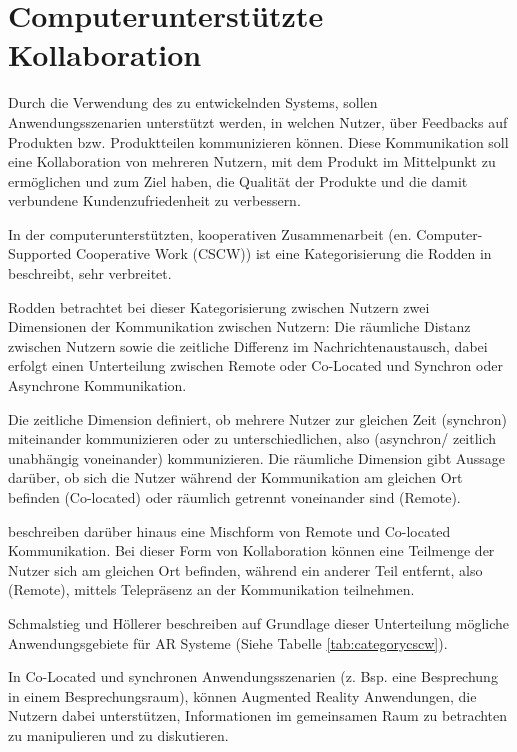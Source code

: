 \section{Computerunterstützte Kollaboration}

Durch die Verwendung des zu entwickelnden Systems, sollen Anwendungsszenarien unterstützt werden, in welchen Nutzer, 
über Feedbacks auf Produkten bzw. Produktteilen kommunizieren können. Diese Kommunikation soll eine Kollaboration von 
mehreren Nutzern, mit dem Produkt im Mittelpunkt zu ermöglichen und zum Ziel haben, die Qualität der Produkte und die 
damit verbundene Kundenzufriedenheit zu verbessern.     

In der computerunterstützten, kooperativen Zusammenarbeit (en. Computer-Supported Cooperative Work (CSCW)) 
ist eine Kategorisierung die Rodden in \cite[S.~2]{Rodden1992} beschreibt, sehr verbreitet.  


Rodden betrachtet bei dieser Kategorisierung zwischen Nutzern zwei Dimensionen der Kommunikation zwischen Nutzern: 
Die räumliche Distanz zwischen Nutzern sowie die zeitliche Differenz im Nachrichtenaustausch, dabei erfolgt einen Unterteilung zwischen 
Remote oder Co-Located und Synchron oder Asynchrone Kommunikation.

Die zeitliche Dimension definiert, ob mehrere Nutzer zur gleichen Zeit (synchron) miteinander kommunizieren 
oder zu unterschiedlichen, also (asynchron/ zeitlich unabhängig voneinander) kommunizieren. Die räumliche Dimension 
gibt Aussage darüber, ob sich die Nutzer während der Kommunikation am gleichen Ort befinden (Co-located) oder räumlich getrennt voneinander sind (Remote). 

\cite[S.~188]{ElSayedNevenA.M.BruceH.ThomasRossT.Smith2015} beschreiben darüber hinaus eine Mischform von Remote und Co-located Kommunikation. 
Bei dieser Form von Kollaboration können eine Teilmenge der Nutzer sich am gleichen Ort befinden, während ein anderer Teil entfernt, 
also (Remote), mittels Telepräsenz an der Kommunikation teilnehmen. 

Schmalstieg und Höllerer \cite{DieterSchmalstieg2016} beschreiben auf Grundlage dieser Unterteilung mögliche 
Anwendungsgebiete für AR Systeme (Siehe Tabelle \ref{tab:categorycscw}).

\cite{DieterSchmalstieg2016} In Co-Located und synchronen Anwendungsszenarien (z. Bsp. eine Besprechung in einem Besprechungsraum), können 
Augmented Reality Anwendungen, die Nutzern dabei unterstützen, Informationen im gemeinsamen Raum zu betrachten zu manipulieren und zu diskutieren. 

